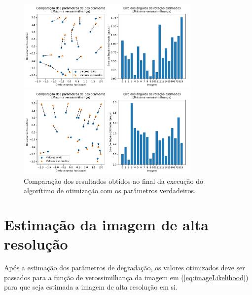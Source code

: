 \begin{figure}[H]
	\centering
	\caption{Comparação dos resultados obtidos ao final da execução do algorítimo de otimização com os parâmetros verdadeiros.}
	\label{fig:comparisson_plots}
	\begin{minipage}[b]{.99\linewidth}
		\centering
		\includegraphics[width=0.8\textwidth]{./figures/results_figures/comparisson_plot.pdf}
	\end{minipage}

	\begin{minipage}[b]{.99\linewidth}
		\centering
		\includegraphics[width=0.8\textwidth]{./figures/results_figures/comparisson_plot2.pdf}
		
	\end{minipage}
\end{figure}


\section{Estimação da imagem de alta resolução}
Após a estimação dos parâmetros de degradação, os valores otimizados deve ser passados para a função de verossimilhança da imagem em (\ref{eq:imageLikelihood}) para que seja estimada a imagem de alta resolução em si.

